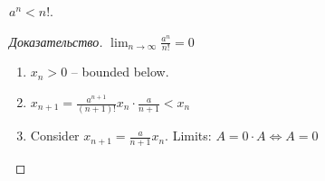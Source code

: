 \begin{lemma}
	$a^{n} < n!$.
\end{lemma}

\begin{proof}[Доказательство]
	$\lim_{n \to \infty} \frac{a^{n}}{n!} = 0$
	\begin{enumerate}
		\item $x_n > 0$ -- bounded below.
		\item $x_{n+1} = \frac{a^{n+1}}{\left( n+1 \right) !} x_n \cdot \frac{a}{n+1} < x_n$ 
		\item  Consider $x_{n+1} = \frac{a}{n+1}x_n$. Limits:  $A = 0 \cdot A \Leftrightarrow A = 0$
	\end{enumerate}
\end{proof}

